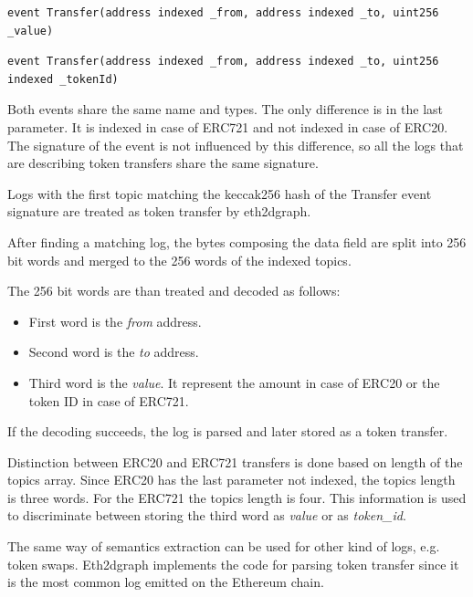 \begin{lstlisting}[caption={Event emitted for ERC20 token transfer},label={lst:erc20-transfer},captionpos=b]
event Transfer(address indexed _from, address indexed _to, uint256 _value)
\end{lstlisting}

\begin{lstlisting}[caption={Event emitted for ERC721 token transfer},label={lst:erc721-transfer},captionpos=b]
event Transfer(address indexed _from, address indexed _to, uint256 indexed _tokenId)
\end{lstlisting}

Both events share the same name and types. The only difference is in the last parameter. It is indexed in case of ERC721 and not indexed in case of ERC20. The signature of the event is not influenced by this difference, so all the logs that are describing token transfers share the same signature.

Logs with the first topic matching the keccak256 hash of the Transfer event signature are treated as token transfer by eth2dgraph.

After finding a matching log, the bytes composing the data field are split into 256 bit words and merged to the 256 words of the indexed topics.

The 256 bit words are than treated and decoded as follows:

\begin{itemize}
    \item First word is the \textit{from} address.
    \item Second word is the \textit{to} address.
    \item Third word is the \textit{value}. It represent the amount in case of ERC20 or the token ID in case of ERC721.
\end{itemize}

If the decoding succeeds, the log is parsed and later stored as a token transfer.

Distinction between ERC20 and ERC721 transfers is done based on length of the topics array. Since ERC20 has the last parameter not indexed, the topics length is three words. For the ERC721 the topics length is four. This information is used to discriminate between storing the third word as \textit{value} or as \textit{token\_id}.

The same way of semantics extraction can be used for other kind of logs, e.g. token swaps. Eth2dgraph implements the code for parsing token transfer since it is the most common log emitted on the Ethereum chain.

